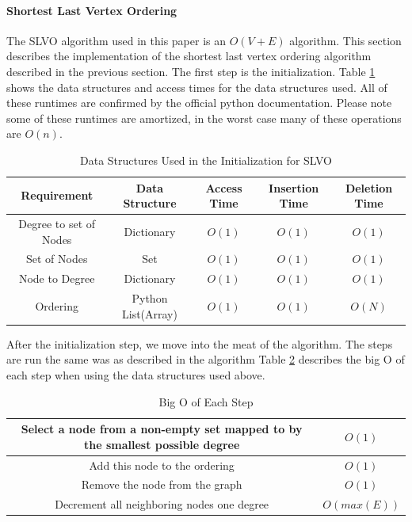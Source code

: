 \documentclass{article}
\begin{document}
    \paragraph{Shortest Last Vertex Ordering}
    The SLVO algorithm used in this paper is an $O(V+E)$ algorithm.
    This section describes the implementation of the shortest last vertex ordering algorithm described in the previous section.
    The first step is the initialization.
    Table \ref{used_structures_slvo} shows the data structures and access times for the data structures used.
    All of these runtimes are confirmed by the official python documentation\cite{pythonwikiruntimes}.
    Please note some of these runtimes are amortized, in the worst case many of these operations are $O(n)$.

    \begin{table}
      \centering
      \label{used_structures_slvo}
      \begin{tabular}{ |c|c|c|c|c| }
        \hline
        Requirement & Data Structure & Access Time & Insertion Time & Deletion Time \\
        \hline
        Degree to set of Nodes & Dictionary & $O(1)$ & $O(1)$ & $O(1)$ \\
        \hline
        Set of Nodes & Set & $O(1)$ & $O(1)$ & $O(1)$ \\
        \hline
        Node to Degree & Dictionary & $O(1)$ & $O(1)$ & $O(1)$ \\
        \hline
        Ordering & Python List(Array) & $O(1)$ & $O(1)$ & $O(N)$ \\
        \hline
      \end{tabular}
      \caption{Data Structures Used in the Initialization for SLVO}
    \end{table}

    After the initialization step, we move into the meat of the algorithm.
    The steps are run the same was as described in the algorithm
    Table \ref{big_o_slvo} describes the big O of each step when using the data structures used above.

    \begin{table}
      \centering
      \label{big_o_slvo}
      \begin{tabular}{ |c|c| }
        \hline
        Select a node from a non-empty set mapped to by the smallest possible degree & $O(1)$ \\
        \hline
        Add this node to the ordering & $O(1)$ \\
        \hline
        Remove the node from the graph & $O(1)$ \\
        \hline
        Decrement all neighboring nodes one degree & $O(max(E))$ \\
        \hline
      \end{tabular}
      \caption{Big O of Each Step}
    \end{table}
\end{document}
